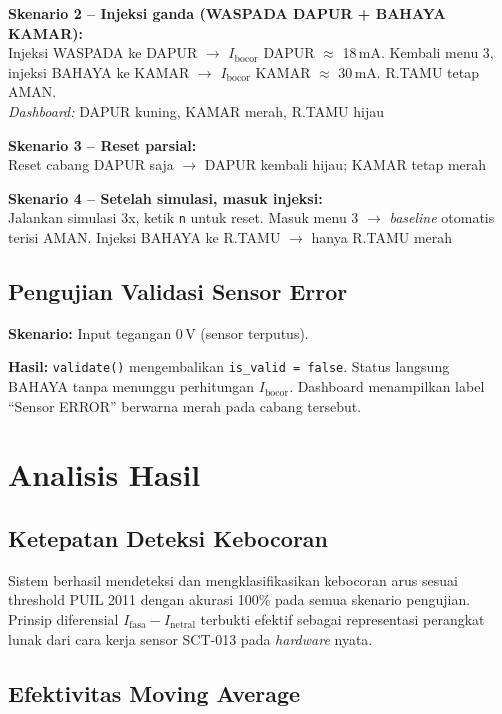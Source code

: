 \documentclass[12pt,a4paper]{article}
\begin{document}
\textbf{Skenario 2 -- Injeksi ganda (WASPADA DAPUR + BAHAYA KAMAR):}\\
Injeksi WASPADA ke DAPUR $\to$ $I_{\text{bocor}}$ DAPUR $\approx$ 18\,mA.
Kembali menu 3, injeksi BAHAYA ke KAMAR $\to$ $I_{\text{bocor}}$ KAMAR
$\approx$ 30\,mA. R.TAMU tetap AMAN.\\
\emph{Dashboard:} DAPUR kuning, KAMAR merah, R.TAMU hijau \checkmark

\textbf{Skenario 3 -- Reset parsial:}\\
Reset cabang DAPUR saja $\to$ DAPUR kembali hijau; KAMAR tetap merah
\checkmark

\textbf{Skenario 4 -- Setelah simulasi, masuk injeksi:}\\
Jalankan simulasi 3x, ketik \texttt{n} untuk reset. Masuk menu 3 $\to$
\emph{baseline} otomatis terisi AMAN. Injeksi BAHAYA ke R.TAMU $\to$ hanya
R.TAMU merah \checkmark

\subsection{Pengujian Validasi Sensor Error}

\textbf{Skenario:} Input tegangan 0\,V (sensor terputus).

\textbf{Hasil:} \texttt{validate()} mengembalikan \texttt{is\_valid = false}.
Status langsung BAHAYA tanpa menunggu perhitungan $I_{\text{bocor}}$. Dashboard
menampilkan label ``Sensor ERROR'' berwarna merah pada cabang tersebut.

\section{Analisis Hasil}

\subsection{Ketepatan Deteksi Kebocoran}

Sistem berhasil mendeteksi dan mengklasifikasikan kebocoran arus sesuai threshold
PUIL 2011 dengan akurasi 100\% pada semua skenario pengujian. Prinsip diferensial
$I_{\text{fasa}} - I_{\text{netral}}$ terbukti efektif sebagai representasi
perangkat lunak dari cara kerja sensor SCT-013 pada \emph{hardware} nyata.

\subsection{Efektivitas Moving Average}
\end{document}
